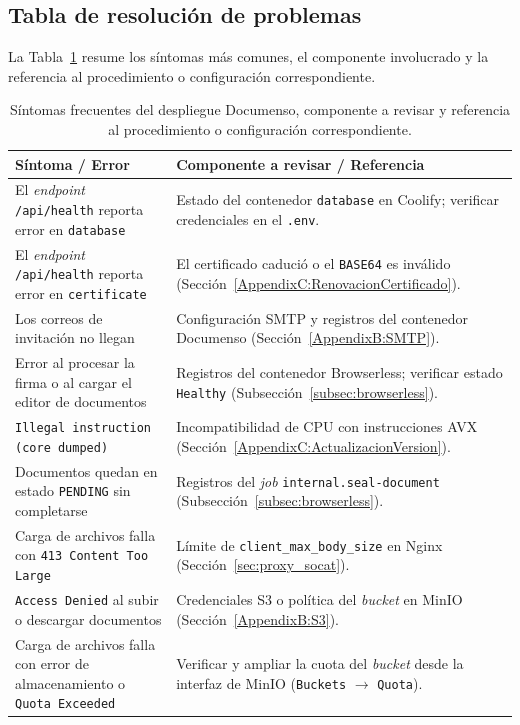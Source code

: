 \subsection{Tabla de resolución de problemas}

La Tabla~\ref{tab:apC_troubleshooting} resume los síntomas más comunes, el componente involucrado y la referencia al procedimiento o configuración correspondiente.

\begin{table}[H]
\centering
\caption[Referencia rápida de resolución de problemas]{Síntomas frecuentes del despliegue Documenso, componente a revisar y referencia al procedimiento o configuración correspondiente.}
\label{tab:apC_troubleshooting}
\small
\begin{tabular}{p{} p{}}
\hline
\textbf{Síntoma / Error} & \textbf{Componente a revisar / Referencia} \\
\hline
El \textit{endpoint} \texttt{/api/health} reporta error en \texttt{database} & Estado del contenedor \texttt{database} en Coolify; verificar credenciales en el \texttt{.env}. \\[6pt]
El \textit{endpoint} \texttt{/api/health} reporta error en \texttt{certificate} & El certificado cadució o el \texttt{BASE64} es inválido (Sección~\ref{AppendixC:RenovacionCertificado}). \\[6pt]
Los correos de invitación no llegan & Configuración SMTP y registros del contenedor Documenso (Sección~\ref{AppendixB:SMTP}). \\[6pt]
Error al procesar la firma o al cargar el editor de documentos & Registros del contenedor Browserless; verificar estado \texttt{Healthy} (Subsección~\ref{subsec:browserless}). \\[6pt]
\texttt{Illegal instruction (core dumped)} & Incompatibilidad de CPU con instrucciones AVX (Sección~\ref{AppendixC:ActualizacionVersion}). \\[6pt]
Documentos quedan en estado \texttt{PENDING} sin completarse & Registros del \textit{job} \texttt{internal.seal-document} (Subsección~\ref{subsec:browserless}). \\[6pt]
Carga de archivos falla con \texttt{413 Content Too Large} & Límite de \texttt{client\_max\_body\_size} en Nginx (Sección~\ref{sec:proxy_socat}). \\[6pt]
\texttt{Access Denied} al subir o descargar documentos & Credenciales S3 o política del \textit{bucket} en MinIO (Sección~\ref{AppendixB:S3}). \\[6pt]
Carga de archivos falla con error de almacenamiento o \texttt{Quota Exceeded} & Verificar y ampliar la cuota del \textit{bucket} desde la interfaz de MinIO (\texttt{Buckets} $\rightarrow$ \texttt{Quota}). \\
\hline
\end{tabular}
\end{table}

